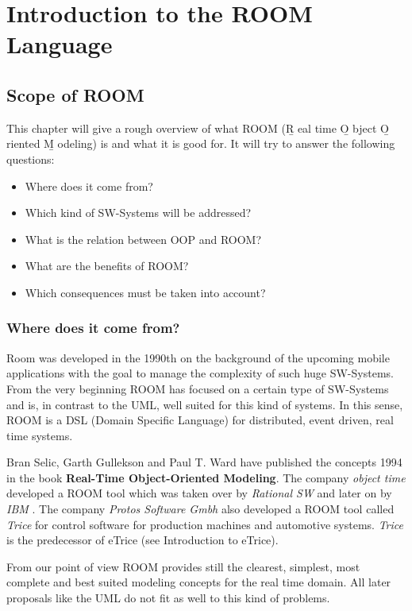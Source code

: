 \chapter{ Introduction to the ROOM Language}

\section{Scope of ROOM}

This chapter will give a rough overview of what ROOM (\b R eal time \b O bject \b O riented \b M odeling) is and what it is good for. It will try to answer the following questions:
\begin{itemize}
\item Where does it come from?
\item Which kind of SW-Systems will be addressed?
\item What is the relation between OOP and ROOM?
\item What are the benefits of ROOM?
\item Which consequences must be taken into account?
\end{itemize}

\subsection{Where does it come from?}

Room was developed in the 1990th on the background of the upcoming mobile applications with the goal to manage the complexity of such huge SW-Systems. From the very beginning ROOM has focused on a certain type of SW-Systems and is, in contrast to the UML, well suited for this kind of systems. In this sense, ROOM is a DSL (Domain Specific Language) for distributed, event driven, real time systems. 

Bran Selic, Garth Gullekson and Paul T. Ward have published the concepts 1994 in the book \textbf{Real-Time Object-Oriented Modeling}. The company \textit{object time} \texttrademark developed a ROOM tool which was taken over by \textit{Rational SW} \texttrademark and later on by \textit{IBM} \texttrademark. 
The company \textit{Protos Software Gmbh} \texttrademark also developed a ROOM tool called \textit{Trice} \texttrademark for control software for production machines and automotive systems. \textit{Trice} \texttrademark is the predecessor of eTrice (see Introduction to eTrice). 
 
From our point of view ROOM provides still the clearest, simplest, most complete and best suited modeling concepts for the real time domain. All later proposals like the UML do not fit as well to this kind of problems.
 

